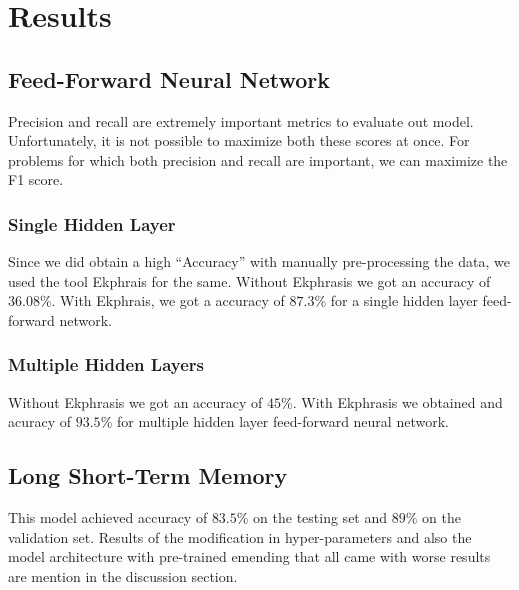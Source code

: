 \section{Results}
\label{sec:results}
\iffalse
Three metrics, in addition to classification accuracy, that are commonly required for a neural network model on a binary classification problem are:
\begin{itemize}
\item Precision: This is the ratio of the true positives to true positives and false positives (true positives / (true positive + false positive)). This is percentage of our results which are relevant.
\item Recall: This is the ratio of the true positives to true positives and false positives (true positives / (true positive + false negative)). This refers to the percentage of total relevant results correctly classified by our algorithm.
\item F1 score: F1 is a metric that takes into account both precision and recall. This number can be maximized to make our model better. F1 score = $2$ *(precision * recall)/(precision + recall)
ds

\end{itemize}
\fi
\subsection{Feed-Forward Neural Network}
Precision and recall are extremely important metrics to evaluate out model. Unfortunately, it is not possible to maximize both these scores at once. For problems for which both precision and recall are important, we can maximize the F1 score.

\subsubsection{Single Hidden Layer} Since we did obtain a high ``Accuracy'' with manually pre-processing the data, we used the tool Ekphrais for the same. Without Ekphrasis we got an accuracy of $36.08$\%. With Ekphrais, we got a accuracy of $87.3$\% for a single hidden layer feed-forward network.

\subsubsection{Multiple Hidden Layers} Without Ekphrasis we got an accuracy of $45$\%. With Ekphrasis we obtained and acuracy of $93.5$\% for multiple hidden layer
feed-forward neural network.

\subsection{Long Short-Term Memory}
This model achieved accuracy of $83.5$\% on the testing set and $89$\% on the validation set. Results of the modification in hyper-parameters and also the model architecture with pre-trained emending that all came with worse results are mention in the discussion section. 
